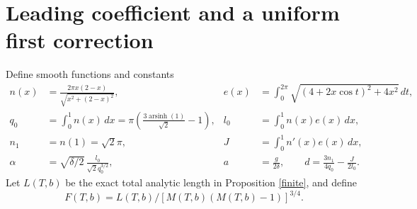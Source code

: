 \documentclass[11pt]{article}
\begin{document}
\section{Leading coefficient and a uniform first correction}
Define smooth functions and constants
\begin{align*}
n(x)&=\frac{2\pi x(2-x)}{\sqrt{x^2+(2-x)^2}},&
e(x)&=\int_0^{2\pi}\sqrt{(4+2x\cos t)^2+4x^2}\,dt,\\
q_0&=\int_0^1n(x)\,dx
=\pi\left(\frac{3\operatorname{arsinh}(1)}{\sqrt2}-1\right),&
l_0&=\int_0^1n(x)e(x)\,dx,\\
n_1&=n(1)=\sqrt2\pi,& J&=\int_0^1n'(x)e(x)\,dx,\\
\alpha&=\sqrt{\delta/2}\,\frac{l_0}{\sqrt2q_0^{3/2}},&
a&=\frac{g}{2\delta},\qquad d=\frac{3n_1}{4q_0}-\frac{J}{2l_0}.
\end{align*}
Let $L(T,b)$ be the exact total analytic length in Proposition \ref{finite},
and define
\[
F(T,b)=L(T,b)/[M(T,b)(M(T,b)-1)]^{3/4}.
\]
\end{document}
